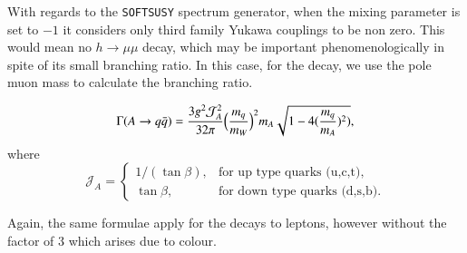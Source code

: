 \documentclass[final,3p,times,pdflatex]{elsarticle}
\begin{document}
With regards to the {\tt SOFTSUSY} spectrum generator, when the mixing parameter is set to $-1$ it considers
only third family Yukawa couplings to be non zero. This would mean no $h \rightarrow \mu \mu$ decay, which may be important phenomenologically in spite of its small branching ratio. In this case, for
the decay, we use the pole muon mass to calculate the branching ratio. 

\begin{equation}\label{Aqq}
\Gamma (A \rightarrow q \bar{q}) = {3 g^2 \mathcal{J}_A^2 \over 32\pi} \Big({m_q \over m_W}\Big)^2 m_A \sqrt{1 - 4 ({m_q \over m_A})^2)},
\end{equation} 
where
\begin{equation}
\mathcal{J}_A=\begin{cases}
    1 /(\tan \beta), & \text{for up type quarks (u,c,t)},\\
    \tan \beta, & \text{for down type quarks (d,s,b)}.
  \end{cases}
\end{equation}

Again, the same formulae apply for the decays to leptons, however without the factor of 3 which arises due to colour.
\end{document}
